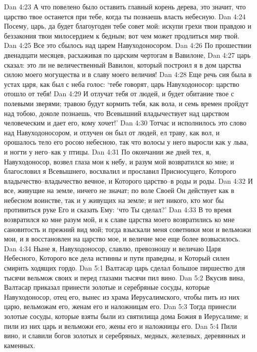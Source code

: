 Dan 4:23  А что повелено было оставить главный корень дерева, это значит, что царство твое останется при тебе, когда ты познаешь власть небесную.
Dan 4:24  Посему, царь, да будет благоугоден тебе совет мой: искупи грехи твои правдою и беззакония твои милосердием к бедным; вот чем может продлиться мир твой.
Dan 4:25  Все это сбылось над царем Навуходоносором.
Dan 4:26  По прошествии двенадцати месяцев, расхаживая по царским чертогам в Вавилоне,
Dan 4:27  царь сказал: это ли не величественный Вавилон, который построил я в дом царства силою моего могущества и в славу моего величия!
Dan 4:28  Еще речь сия была в устах царя, как был с неба голос: `тебе говорят, царь Навуходоносор: царство отошло от тебя!
Dan 4:29  И отлучат тебя от людей, и будет обитание твое с полевыми зверями; травою будут кормить тебя, как вола, и семь времен пройдут над тобою, доколе познаешь, что Всевышний владычествует над царством человеческим и дает его, кому хочет!'
Dan 4:30  Тотчас и исполнилось это слово над Навуходоносором, и отлучен он был от людей, ел траву, как вол, и орошалось тело его росою небесною, так что волосы у него выросли как у льва, и ногти у него--как у птицы.
Dan 4:31  По окончании же дней тех, я, Навуходоносор, возвел глаза мои к небу, и разум мой возвратился ко мне; и благословил я Всевышнего, восхвалил и прославил Присносущего, Которого владычество--владычество вечное, и Которого царство--в роды и роды.
Dan 4:32  И все, живущие на земле, ничего не значат; по воле Своей Он действует как в небесном воинстве, так и у живущих на земле; и нет никого, кто мог бы противиться руке Его и сказать Ему: `что Ты сделал?'
Dan 4:33  В то время возвратился ко мне разум мой, и к славе царства моего возвратились ко мне сановитость и прежний вид мой; тогда взыскали меня советники мои и вельможи мои, и я восстановлен на царство мое, и величие мое еще более возвысилось.
Dan 4:34  Ныне я, Навуходоносор, славлю, превозношу и величаю Царя Небесного, Которого все дела истинны и пути праведны, и Который силен смирить ходящих гордо.
Dan 5:1  Валтасар царь сделал большое пиршество для тысячи вельмож своих и перед глазами тысячи пил вино.
Dan 5:2  Вкусив вина, Валтасар приказал принести золотые и серебряные сосуды, которые Навуходоносор, отец его, вынес из храма Иерусалимского, чтобы пить из них царю, вельможам его, женам его и наложницам его.
Dan 5:3  Тогда принесли золотые сосуды, которые взяты были из святилища дома Божия в Иерусалиме; и пили из них царь и вельможи его, жены его и наложницы его.
Dan 5:4  Пили вино, и славили богов золотых и серебряных, медных, железных, деревянных и каменных.
